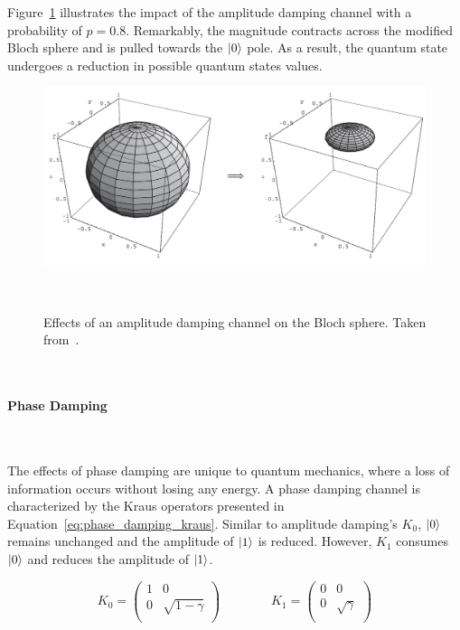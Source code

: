 Figure~\ref{fig:amplitude_damping} illustrates the impact of the
amplitude damping channel with a probability of \(p=0.8\). Remarkably,
the magnitude contracts across the modified Bloch sphere and is pulled
towards the \(\ket{0}\) pole. As a result, the quantum state undergoes
a reduction in possible quantum states values. \

\begin{figure}[h!]
  \includegraphics[scale=0.39]{figures/amplitude_damping.png}
  \centering
  \caption{Effects of an amplitude damping channel on the Bloch sphere. Taken from~\cite{nielsen_quantum_2010}.}
~\label{fig:amplitude_damping}
\end{figure} \

\paragraph{Phase Damping} \

The effects of phase damping are unique to quantum mechanics, where
a loss of information occurs without losing any energy. A phase
damping channel is characterized by the Kraus operators presented
in Equation~\ref{eq:phase_damping_kraus}. Similar to amplitude
damping's \(K_0\), \(\ket{0}\) remains unchanged and the amplitude
of \(\ket{1}\) is reduced. However, \(K_1\) consumes \(\ket{0}\)
and reduces the amplitude of \(\ket{1}\). \

\begin{equation}\label{eq:phase_damping_kraus}
  K_0 = \begin{pmatrix}
          1 & 0 \\
          0 & \sqrt{1-\gamma} \\
        \end{pmatrix} \qquad \qquad
  K_1 = \begin{pmatrix}
          0 & 0 \\
          0 & \sqrt{\gamma} \\
        \end{pmatrix}
\end{equation} \

